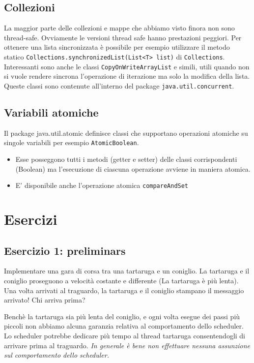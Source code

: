 \documentclass{article}
\begin{document}
\subsection{Collezioni}
La maggior parte delle collezioni e mappe che abbiamo visto finora non sono thread-safe. Ovviamente le versioni thread safe hanno prestazioni peggiori. Per ottenere una lista sincronizzata \`e possibile per esempio utilizzare il metodo statico \texttt{Collections.synchronizedList(List<T> list)} di \texttt{Collections}. Interessanti sono anche le classi \texttt{CopyOnWriteArrayList} e simili, utili quando non si vuole rendere sincrona l'operazione di iterazione ma solo la modifica della lista. Queste classi sono contenute all'interno del package \texttt{java.util.concurrent}.

\subsection{Variabili atomiche}
Il package java.util.atomic definisce classi che supportano operazioni atomiche su singole variabili per esempio \texttt{AtomicBoolean}.
\begin{itemize}
\item Esse posseggono tutti i metodi (getter e setter) delle classi corrispondenti (Boolean) ma l'esecuzione di ciascuna operazione avviene in maniera atomica.
\item E' disponibile anche l'operazione atomica \texttt{compareAndSet}
\end{itemize} 

\section{Esercizi}

\subsection{Esercizio 1: preliminars}
\begin{framed}
Implementare una gara di corsa tra una tartaruga e un coniglio. La tartaruga e il coniglio proseguono a velocit\`a costante e differente (La tartaruga \`e pi\`u lenta).  Una volta arrivati al traguardo, la tartaruga e il coniglio stampano il messaggio arrivato! Chi arriva prima?
\end{framed}
Bench\`e la tartaruga sia pi\`u lenta del coniglio, e ogni volta esegue dei passi pi\`u piccoli non abbiamo alcuna garanzia relativa al comportamento dello scheduler. Lo scheduler potrebbe dedicare pi\`u tempo al thread tartaruga consentendogli di arrivare prima al traguardo. \emph{In generale \`e bene non effettuare nessuna assunzione sul comportamento dello scheduler.}
\end{document}
